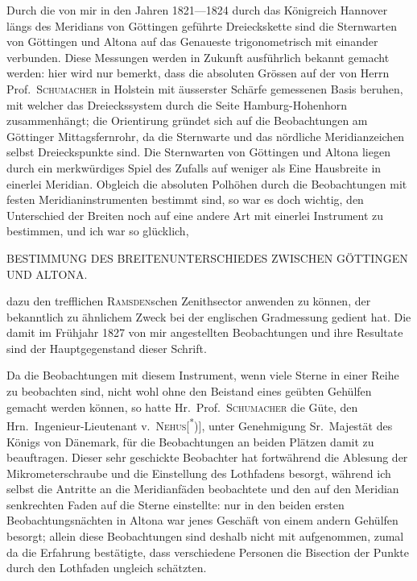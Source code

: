 Durch die von mir in den Jahren 1821---1824 durch das Königreich Hannover
längs des Meridians von Göttingen geführte Dreieckskette sind die
Sternwarten von Göttingen und Altona auf das Genaueste trigonometrisch mit
einander verbunden. Diese Messungen werden in Zukunft ausführlich bekannt
gemacht werden: hier wird nur bemerkt, dass die absoluten Grössen
auf der von Herrn Prof.\ \textsc{Schumacher} in Holstein mit äusserster Schärfe gemessenen
Basis beruhen, mit welcher das Dreieckssystem durch die Seite
Hamburg-Hohenhorn zusammenhängt; die Orientirung gründet sich auf die
Beobachtungen am Göttinger Mittagsfernrohr, da die Sternwarte und das
nördliche Meridianzeichen selbst Dreieckspunkte sind. Die Sternwarten von
Göttingen und Altona liegen durch ein merkwürdiges Spiel des Zufalls auf
weniger als Eine Hausbreite in einerlei Meridian. Obgleich die absoluten
Polhöhen durch die Beobachtungen mit festen Meridianinstrumenten bestimmt
sind, so war es doch wichtig, den Unterschied der Breiten noch auf eine
andere Art mit einerlei Instrument zu bestimmen, und ich war so glücklich,

\clearpage
\noindent{}\parbox[t]{\dimexpr\textwidth-10mm\relax}{\centering\scriptsize BESTIMMUNG DES\,\quotedblbase\,BREITENUNTERSCHIEDES ZWISCHEN GÖTTINGEN UND ALTONA.}\par
\noindent dazu den trefflichen \textsc{Ramsden}schen Zenithsector anwenden zu können, der bekanntlich
zu ähnlichem Zweck bei der englischen Gradmessung gedient hat.
Die damit im Frühjahr 1827 von mir angestellten Beobachtungen und ihre
Resultate sind der Hauptgegenstand dieser Schrift.

Da die Beobachtungen mit diesem Instrument, wenn viele Sterne in einer
Reihe zu beobachten sind, nicht wohl ohne den Beistand eines geübten Gehülfen
gemacht werden können, so hatte Hr.\ Prof.\ \textsc{Schumacher} die Güte,
den Hrn.\ Ingenieur-Lieutenant v.\ \textsc{Nehus}[\textsuperscript{*})], unter Genehmigung Sr.\ Majestät
des Königs von Dänemark, für die Beobachtungen an beiden Plätzen damit zu
beauftragen. Dieser sehr geschickte Beobachter hat fortwährend die Ablesung
der Mikrometerschraube und die Einstellung des Lothfadens besorgt, während
ich selbst die Antritte an die Meridianfäden beobachtete und den auf den
Meridian senkrechten Faden auf die Sterne einstellte: nur in den beiden
ersten Beobachtungsnächten in Altona war jenes Geschäft von einem andern
Gehülfen besorgt; allein diese Beobachtungen sind deshalb nicht mit aufgenommen,
zumal da die Erfahrung bestätigte, dass verschiedene Personen die
Bisection der Punkte durch den Lothfaden ungleich schätzten.

